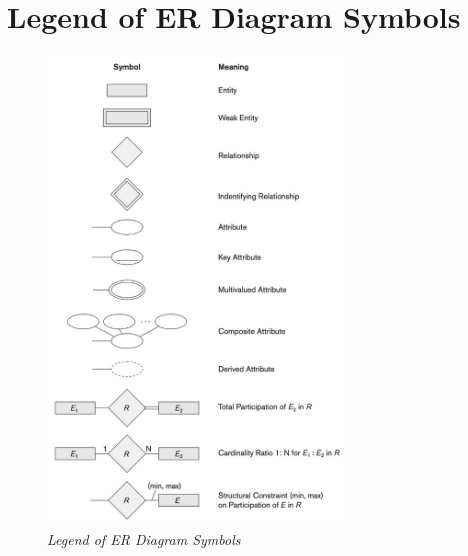 \section{Legend of ER Diagram Symbols}

\begin{figure}[H]
  \includegraphics[width=0.7\textwidth]{images/legend.png}
  \caption{\textit{Legend of ER Diagram Symbols}}
\end{figure}